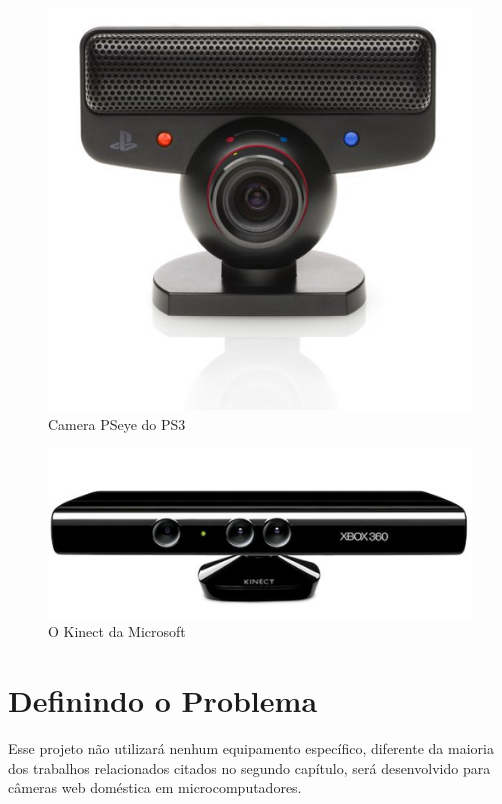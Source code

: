 \begin{figure}[h]
    \center
    \includegraphics[scale=0.25]{imagens/pseye.jpg}

    \caption{Camera  PSeye do PS3}
    \label{pseye}
\end{figure}

\begin{figure}[h]
    \center
    \includegraphics[scale=0.35]{imagens/kinect.jpg}

    \caption{O Kinect da Microsoft}
    \label{kinect}
\end{figure}

\section{Definindo o Problema}

Esse projeto não utilizará nenhum equipamento específico, diferente da maioria
dos trabalhos relacionados citados no segundo capítulo, será desenvolvido para câmeras
web doméstica em microcomputadores.


